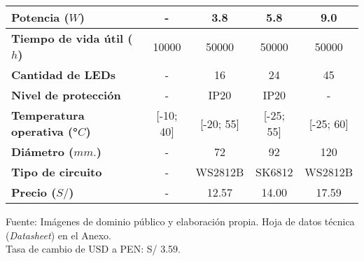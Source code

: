 \begin{savenotes}
\begin{mytable}[H]
\begin{tabular}{l|c|c|c|c|}
			\multicolumn{1}{|l|}{
				\begin{minipage}{\myforthmaxsizeofcontenttable}	
					\textbf{Potencia ($W$)}
				\end{minipage}
			} & - & 3.8 & 5.8 & 9.0 \\ \hline
			
			\multicolumn{1}{|l|}{
				\begin{minipage}{\myforthmaxsizeofcontenttable}	
					\textbf{Tiempo de vida útil ($h$)}
				\end{minipage}
			} & 10000 & 50000 & 50000 & 50000 \\ \hline
			
			\multicolumn{1}{|l|}{
				\begin{minipage}{\myforthmaxsizeofcontenttable}	
					\textbf{Cantidad de LEDs}
				\end{minipage}
			} & - & 16 & 24 & 45 \\ \hline
			
			\multicolumn{1}{|l|}{
				\begin{minipage}{\myforthmaxsizeofcontenttable}	
					\textbf{Nivel de protección}
				\end{minipage}
			} & - & IP20 & IP20 & - \\ \hline			
			\multicolumn{1}{|l|}{
				\begin{minipage}{\myforthmaxsizeofcontenttable}	
					\textbf{Temperatura operativa (°$C$)}
				\end{minipage}
			} & [-10; 40] & [-20; 55] & [-25; 55] & [-25; 60] \\ \hline			
			\multicolumn{1}{|l|}{
				\begin{minipage}{\myforthmaxsizeofcontenttable}	
					\textbf{Diámetro ($mm.$)}
				\end{minipage}
			} & - & 72 & 92 & 120 \\ \hline			
			\multicolumn{1}{|l|}{
				\begin{minipage}{\myforthmaxsizeofcontenttable}	
					\textbf{Tipo de circuito}
				\end{minipage}
			} & - & WS2812B & SK6812 & WS2812B \\ \hline			
			\multicolumn{1}{|l|}{
				\begin{minipage}{\myforthmaxsizeofcontenttable}	
					\textbf{Precio ($S/$)}
				\end{minipage}
			} & - & 12.57 & 14.00 & 17.59 \\ \hline
		\end{tabular}
		\begin{myflushcenteraftertable}	
			Fuente: Imágenes de dominio público y elaboración propia. Hoja de datos técnica (\textit{Datasheet}) en el Anexo.\\
			Tasa de cambio de USD a PEN: S/ 3.59.
		\end{myflushcenteraftertable}
	\end{mytable}
\end{savenotes}

